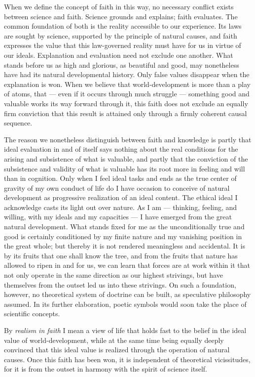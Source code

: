 \documentclass[12pt,a4paper,openany]{book}
\newcommand{\opage}[1]{\marginnote{\footnotesize\textit{[#1]}}}
\begin{document}
When we define the concept of faith in this way, no necessary conflict exists between science and faith. Science grounds and explains; faith evaluates. The common foundation of both is the reality accessible to our experience. Its laws are sought by science, supported by the principle of natural causes, and faith expresses the value that this law-governed reality must have for us in virtue of our ideals. Explanation and evaluation need not exclude one another. What stands before us as high and glorious, as beautiful and good, may nonetheless have had its natural developmental history. Only false values disappear when the explanation is won. When we believe that world-development is more than a play of atoms, that --- even if it occurs through much struggle --- something good and valuable works its way forward through it, this faith does not exclude an equally firm conviction that this result is attained only through a firmly coherent causal sequence.

The reason we nonetheless distinguish between faith and knowledge is partly that ideal evaluation in and of itself says
\opage{11}nothing about the real conditions for the arising and subsistence of what is valuable, and partly that the conviction of the subsistence and validity of what is valuable has its root more in feeling and will than in cognition. Only when I feel ideal tasks and ends as the true center of gravity of my own conduct of life do I have occasion to conceive of natural development as progressive realization of an ideal content. The ethical ideal I acknowledge casts its light out over nature. As I am --- thinking, feeling, and willing, with my ideals and my capacities --- I have emerged from the great natural development. What stands fixed for me as the unconditionally true and good is certainly conditioned by my finite nature and my vanishing position in the great whole; but thereby it is not rendered meaningless and accidental. It is by its fruits that one shall know the tree, and from the fruits that nature has allowed to ripen in and for us, we can learn that forces are at work within it that not only operate in the same direction as our highest strivings, but have themselves from the outset led us into these strivings. On such a foundation, however, no theoretical system of doctrine can be built, as speculative philosophy assumed. In its further elaboration, poetic symbols would soon take the place of scientific concepts.

By \emph{realism in faith} I mean a view of life that holds fast to the belief in the ideal value of world-development, while at the same time being equally deeply convinced that this ideal value is realized through the operation of natural causes. Once this faith has been won, it is independent of theoretical vicissitudes, for it is from the outset in harmony with the spirit of science itself.
\end{document}
